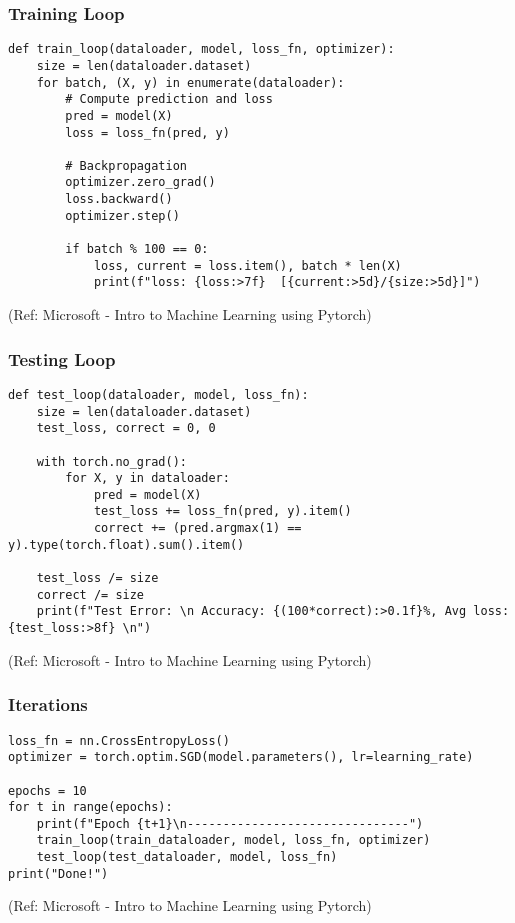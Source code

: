 \begin{frame}[fragile] \frametitle{Training Loop}


\begin{lstlisting}
def train_loop(dataloader, model, loss_fn, optimizer):
    size = len(dataloader.dataset)
    for batch, (X, y) in enumerate(dataloader):        
        # Compute prediction and loss
        pred = model(X)
        loss = loss_fn(pred, y)
        
        # Backpropagation
        optimizer.zero_grad()
        loss.backward()
        optimizer.step()

        if batch % 100 == 0:
            loss, current = loss.item(), batch * len(X)
            print(f"loss: {loss:>7f}  [{current:>5d}/{size:>5d}]")
\end{lstlisting}

\tiny{(Ref: Microsoft - Intro to Machine Learning using Pytorch)}
\end{frame}




\begin{frame}[fragile] \frametitle{Testing Loop}


\begin{lstlisting}
def test_loop(dataloader, model, loss_fn):
    size = len(dataloader.dataset)
    test_loss, correct = 0, 0

    with torch.no_grad():
        for X, y in dataloader:
            pred = model(X)
            test_loss += loss_fn(pred, y).item()
            correct += (pred.argmax(1) == y).type(torch.float).sum().item()
            
    test_loss /= size
    correct /= size
    print(f"Test Error: \n Accuracy: {(100*correct):>0.1f}%, Avg loss: {test_loss:>8f} \n")
\end{lstlisting}

\tiny{(Ref: Microsoft - Intro to Machine Learning using Pytorch)}
\end{frame}


\begin{frame}[fragile] \frametitle{Iterations}


\begin{lstlisting}
loss_fn = nn.CrossEntropyLoss()
optimizer = torch.optim.SGD(model.parameters(), lr=learning_rate)

epochs = 10
for t in range(epochs):
    print(f"Epoch {t+1}\n-------------------------------")
    train_loop(train_dataloader, model, loss_fn, optimizer)
    test_loop(test_dataloader, model, loss_fn)
print("Done!")
\end{lstlisting}

\tiny{(Ref: Microsoft - Intro to Machine Learning using Pytorch)}
\end{frame}



